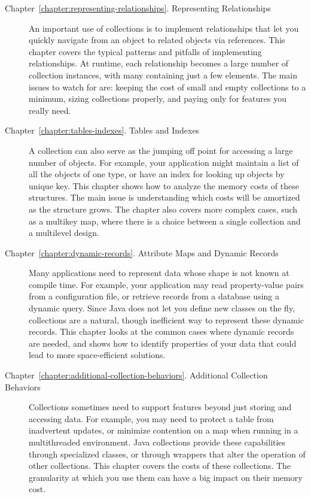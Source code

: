\begin{description}
\item[Chapter~\ref{chapter:representing-relationships}. Representing
Relationships] An important use of collections is to implement
relationships that let you quickly navigate from an object to related objects
via references. This chapter covers the typical patterns and pitfalls of
implementing relationships. At runtime, each relationship becomes a
large number of collection instances, with many containing just a few elements.
The main issues to watch for
are: keeping the cost of small and empty collections to a minimum, sizing
collections properly, and paying only for features you really need.

\item[Chapter~\ref{chapter:tables-indexes}. Tables and Indexes] A collection
can also serve as the jumping off
point for accessing a large number of objects. For example, your application
might maintain a list of all the objects of one type, or have an index for
looking up objects by unique key. This chapter shows how to analyze the memory
costs of these structures. The main
issue is understanding which costs will be amortized as the structure grows. The
chapter also covers more complex cases, such as a multikey map, where there is a
choice between a single collection and a multilevel design.

\item[Chapter~\ref{chapter:dynamic-records}. Attribute Maps and Dynamic
Records] Many applications need to represent data whose shape is not
known at compile time. For example, your application may read property-value
pairs from a configuration file, or retrieve records from a database
using a dynamic query. Since Java does not let you define new classes on the
fly, collections are a natural, though inefficient way to represent
these dynamic records. This chapter looks at the common cases where dynamic records
are needed, and shows how to identify properties of your data that could lead to
more space-efficient solutions.

\item[Chapter~\ref{chapter:additional-collection-behaviors}. Additional
Collection Behaviors] Collections sometimes need to support features
beyond just storing and accessing data. For example,
you may need to protect a table from inadvertent
updates, or minimize contention on a map when running in a
multithreaded environment. Java collections provide these capabilities through
specialized classes, or through wrappers that alter
the operation of other collections. This chapter covers the costs of
these collections.  The granularity
at which you use them can have a big impact on their memory
cost.

\end{description}

